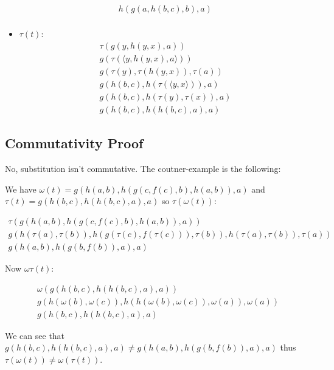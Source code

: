 \documentclass[11pt]{article}
\begin{document}
\begin{itemize}
{\[\begin{array}{ll}
      h(g(a,h(b,c),b),a)\\
    \end{array}
    \]
  }
  \item{$\tau(t)$:
    \[
    \begin{array}{ll}
      \tau(g(y,h(y,x),a))\\
      g(\tau(\langle y,h(y,x),a \rangle))\\
      g(\tau(y),\tau(h(y,x)),\tau(a))\\
      g(h(b,c),h(\tau(\langle y,x\rangle)),a)\\
      g(h(b,c),h(\tau(y),\tau(x)),a)\\
      g(h(b,c),h(h(b,c),a),a)
    \end{array}
    \]
  }
\end{itemize}

\subsection{Commutativity Proof}

No, substitution isn't commutative. The coutner-example is the following:

We have $\omega(t)=g(h(a,b),h(g(c,f(c),b),h(a,b)),a)$ and $\tau(t)=g(h(b,c),h(h(b,c),a),a)$ so $\tau(\omega(t))$:

\[
\begin{array}{ll}
  \tau(g(h(a,b),h(g(c,f(c),b),h(a,b)),a))\\
  g(h(\tau(a),\tau(b)),h(g(\tau(c),f(\tau(c))),\tau(b)),h(\tau(a),\tau(b)),\tau(a))\\
  g(h(a,b),h(g(b,f(b)),a),a)
\end{array}
\]

Now $\omega\tau(t)$:

\[
\begin{array}{ll}
  \omega(g(h(b,c),h(h(b,c),a),a))\\
  g(h(\omega(b),\omega(c)),h(h(\omega(b),\omega(c)),\omega(a)),\omega(a))\\
  g(h(b,c),h(h(b,c),a),a)
\end{array}
\]

We can see that $g(h(b,c),h(h(b,c),a),a)\neq g(h(a,b),h(g(b,f(b)),a),a)$ thus $\tau(\omega(t))\neq\omega(\tau(t))$.
\end{document}

